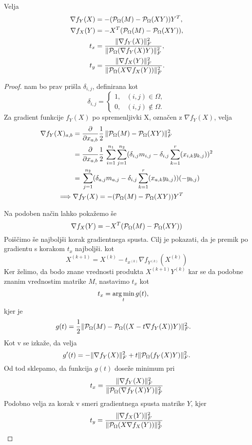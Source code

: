 \begin{theorem}
Velja
\begin{align*}
    \nabla f_Y(X) &= -(\mathcal{P}_\Omega(M) - \mathcal{P}_\Omega(XY))Y^T,\\
    \nabla f_X(Y) &= -X^T (\mathcal{P}_\Omega(M) - \mathcal{P}_\Omega(XY)),\\
    t_x &= \frac{\lVert\nabla f_Y(X)\rVert_F^2}{\lVert\mathcal{P}_\Omega(\nabla f_Y(X)Y)\rVert_F^2},  \\
    t_y &= \frac{\lVert\nabla f_X(Y)\rVert_F^2}{\lVert\mathcal{P}_\Omega(X \nabla f_X(Y))\rVert_F^2}. 
\end{align*}
\end{theorem}

\begin{proof}
 nam bo prav prišla  $\delta_{i, j}$, definirana kot
\[
    \delta_{i,j} = 
    \left\{
    \begin{array}{rl}
        1,& (i, j) \in \Omega, \\
        0,& (i, j) \notin \Omega.
    \end{array}
    \right.
\]
Za gradient funkcije $f_Y(X)$ po spremenljivki X, označen z $\nabla f_Y(X)$, velja
\begin{align*}
    \nabla f_Y(X)_{a,b} &= \frac{\partial}{\partial x_{a,b}} \frac{1}{2}\, \lVert\mathcal{P}_\Omega(M) - \mathcal{P}_\Omega(XY)\rVert_F^2  \\
    &= \frac{\partial}{\partial x_{a,b}} \frac{1}{2}\, \sum_{i=1}^{n_1}\sum_{j=1}^{n_2}(\delta_{i,j}m_{i,j} - \delta_{i,j}\sum_{k=1}^{r}(x_{i,k}y_{k,j}))^2  \\
    &= \, \sum_{j=1}^{n_2}(\delta_{a,j}m_{a,j} - \delta_{i,j}\sum_{k=1}^{r}(x_{a,k}y_{k,j}))(-y_{b,j}) \\
    \implies &\nabla f_Y(X) = -(\mathcal{P}_\Omega(M) - \mathcal{P}_\Omega(XY))Y^T
\end{align*}

Na podoben način lahko pokažemo še
\[
    \nabla f_X(Y) = -X^T (\mathcal{P}_\Omega(M) - \mathcal{P}_\Omega(XY))
\]
Poiščimo še najboljši korak gradientnega spusta.
Cilj je pokazati, da je premik po gradientu s korakom $t_x$ najboljši.
 kot
\[
    X^{(k+1)} = X^{(k)} - t_{x^{(k)}} \nabla f_{Y^{(k)}}(X^{(k)})
\]
Ker želimo, da bodo znane vrednosti produkta $X^{(k+1)}Y^{(k)}$ kar se da podobne znanim vrednostim matrike $M$, nastavimo $t_x$ kot 
\begin{align*}
    t_x &= \operatorname*{arg\,min}_t g(t),
\end{align*} kjer je
\begin{align*}
    g(t) &= \frac{1}{2} \lVert\mathcal{P}_\Omega(M) - \mathcal{P}_\Omega((X - t\nabla f_Y(X))Y)\rVert_F^2.
\end{align*}
Kot v \cite{AST-TK15} se izkaže, da velja
\[
  g'(t) = -\lVert\nabla f_Y(X)\rVert_F^2 + t\lVert\mathcal{P}_\Omega(f_Y(X)Y)\rVert_F^2. 
\]
Od tod sklepamo, da funkcija $g(t)$ doseže minimum pri 
\[
  t_x = \frac{\lVert\nabla f_Y(X)\rVert_F^2}{\lVert\mathcal{P}_\Omega(\nabla f_Y(X)Y)\rVert_F^2}  
\]
Podobno velja za korak v smeri gradientnega spusta matrike $Y$, kjer
\[
  t_y = \frac{\lVert\nabla f_X(Y)\rVert_F^2}{\lVert\mathcal{P}_\Omega(X \nabla f_X(Y))\rVert_F^2}  
\]

\end{proof}